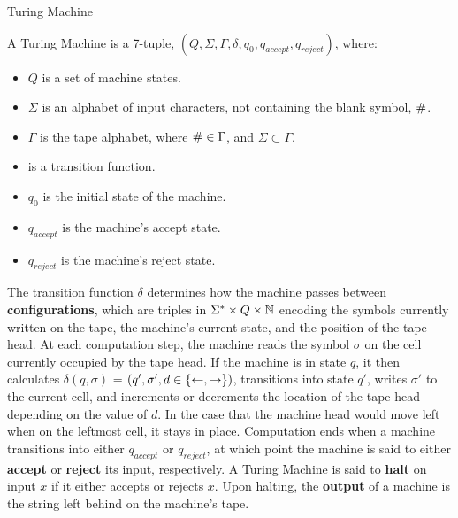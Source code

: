 \begin{definition}{Turing Machine}

  A Turing Machine is a 7-tuple, $(Q, \Sigma, \Gamma, \delta, q_0, q_{accept}, q_{reject})$, where:

  \begin{itemize}
  \item $Q$ is a set of machine states.
  \item $\Sigma$ is an alphabet of input characters, not containing
    the blank symbol, $\#$.
  \item $\Gamma$ is the tape alphabet, where $\# \in \Gamma$, and
    $\Sigma \subset \Gamma$.
  \item {} is a transition function.
  \item $q_0$ is the initial state of the machine.
  \item $q_{accept}$ is the machine's accept state.
  \item $q_{reject}$ is the machine's reject state.
  \end{itemize}

  The transition function $\delta$ determines how the machine passes
  between \textbf{configurations}, which are triples in $\Sigma^*
  \times Q \times \mathbb{N}$ encoding the symbols currently written on
  the tape, the machine's current state, and the position of the tape
  head.  At each computation step, the machine reads the symbol
  $\sigma$ on the cell currently occupied by the tape head.  If the
  machine is in state $q$, it then calculates $\delta(q, \sigma)$ =
  $(q', \sigma', d \in \{\leftarrow, \rightarrow\})$, transitions
  into state $q'$, writes $\sigma'$ to the current cell, and
  increments or decrements the location of the tape head depending on
  the value of $d$.  In the case that the machine head would move left
  when on the leftmost cell, it stays in place.  Computation ends when
  a machine transitions into either $q_{accept}$ or $q_{reject}$, at
  which point the machine is said to either \textbf{accept} or
  \textbf{reject} its input, respectively.  A Turing Machine is said
  to \textbf{halt} on input $x$ if it either accepts or rejects $x$.
  Upon halting, the \textbf{output} of a machine is the string left
  behind on the machine's tape.
  
\end{definition}

